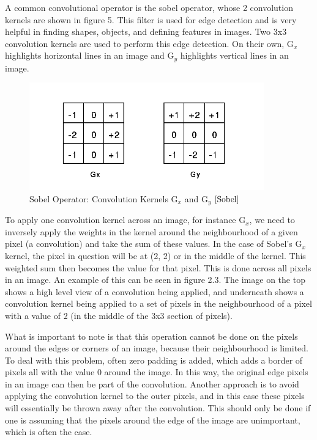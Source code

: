 \documentclass[12pt]{report} %
\begin{document}
	A common convolutional operator is the sobel operator, whose 2 convolution kernels are shown in figure 5. This filter is used for edge detection and is very helpful in finding shapes, objects, and defining features in images. Two 3x3 convolution kernels are used to perform this edge detection\cite{Sobel}. On their own, G$_{x}$ highlights horizontal lines in an image and G$_{y}$ highlights vertical lines in an image.
\begin{figure}
\centering
\includegraphics[width=4in]{sobel_operator} 
\caption{Sobel Operator: Convolution Kernels G$_{x}$ and G$_{y}$ $\cite{Sobel}$}
\end{figure}	
	 To apply one convolution kernel across an image, for instance G$_{x}$, we need to inversely apply the weights in the kernel around the neighbourhood of a given pixel (a convolution) and take the sum of these values. In the case of Sobel's G$_{x}$ kernel, the pixel in question will be at (2, 2) or in the middle of the kernel. This weighted sum then becomes the value for that pixel. This is done across all pixels in an image\cite{RiverTrail}. 
	 An example of this can be seen in figure 2.3. The image on the top shows a high level view of a convolution being applied, and underneath shows a convolution kernel being applied to a set of pixels in the neighbourhood of a pixel with a value of 2 (in the middle of the 3x3 section of pixels).	 
	 
	 What is important to note is that this operation cannot be done on the pixels around the edges or corners of an image, because their neighbourhood is limited. To deal with this problem, often zero padding is added, which adds a border of pixels all with the value 0 around the image. In this way, the original edge pixels in an image can then be part of the convolution. \cite{Sobel} Another approach is to avoid applying the convolution kernel to the outer pixels, and in this case these pixels will essentially be thrown away after the convolution. This should only be done if one is assuming that the pixels around the edge of the image are unimportant, which is often the case.
	 
\end{document}
